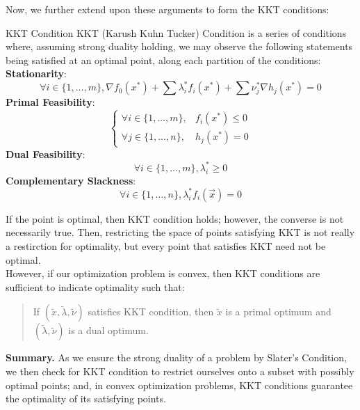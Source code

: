 Now, we further extend upon these arguments to form the KKT conditions:
\begin{ln-define}{KKT Condition}{}
    KKT (Karush Kuhn Tucker) Condition is a series of conditions where, assuming strong duality holding, we may observe the following statements being satisfied at an optimal point, along each partition of the conditions: \\
    \textbf{Stationarity}:
    \[
        \forall i \in \{1, \dots, m\}, \nabla f_0(x^*) + \sum \lambda_i^* {f_i(x^*)} + \sum \nu_j^* \nabla h_j (x^*) = 0
    \]
    \textbf{Primal Feasibility}:
    \[
        \begin{cases}
            \forall i \in \{1, \dots, m\}, &f_i(x^*) \leq 0 \\
            \forall j \in \{1, \dots, n\}, &h_j(x^*) = 0
        \end{cases}
    \]
    \textbf{Dual Feasibility}:
    \[
        \forall i \in \{1, \dots, m\}, \lambda_i^* \geq 0
    \]
    \textbf{Complementary Slackness}:
    \[
        \forall i \in \{1, \dots, n\}, \lambda_i^* f_i(\vec{x}) = 0
    \]
\end{ln-define}
If the point is optimal, then KKT condition holds; however, the converse is not necessarily true.
Then, restricting the space of points satisfying KKT is not really a restirction for optimality, but every point that satisfies KKT need not be optimal. \\
However, if our optimization problem is convex, then KKT conditions are sufficient to indicate optimality such that:
\begin{quote}
    If $(\tilde{x}, \tilde{\lambda}, \tilde{\nu})$ satisfies KKT condition, then $\tilde{x}$ is a primal optimum and $(\tilde{\lambda}, \tilde{\nu})$ is a dual optimum.
\end{quote}

\textbf{Summary.} As we ensure the strong duality of a problem by Slater's Condition, we then check for KKT condition to restrict ourselves onto a subset with possibly optimal points; and, in convex optimization problems, KKT conditions guarantee the optimality of its satisfying points.

